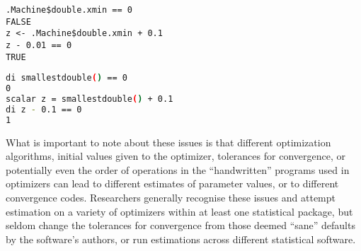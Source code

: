 \documentclass[../main.tex]{subfiles}
\begin{document}
\begin{lrbox}{\LstBoxR}
\begin{lstlisting}
.Machine$double.xmin == 0
FALSE
z <- .Machine$double.xmin + 0.1
z - 0.01 == 0
TRUE
\end{lstlisting}
\end{lrbox}

\begin{lrbox}{\LstBoxStata}
\begin{lstlisting}[language=bash]
di smallestdouble() == 0
0
scalar z = smallestdouble() + 0.1
di z - 0.1 == 0
1
\end{lstlisting}
\end{lrbox}

\addtocounter{footnote}{-2}

What is important to note about these issues is that different optimization algorithms, initial values given to the optimizer, tolerances for convergence, or potentially even the order of operations in the \enquote{handwritten} programs used in optimizers can lead to different estimates of parameter values, or to different convergence codes.{\footnotemark}
Researchers generally recognise these issues and attempt estimation on a variety of optimizers within at least one statistical package, but seldom change the tolerances for convergence from those deemed \enquote{sane} defaults by the software's authors, or run estimations across different statistical software.{\footnotemark}
\end{document}
